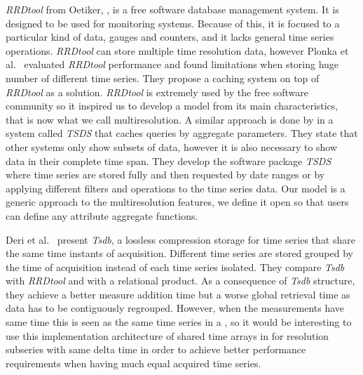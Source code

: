 \emph{RRDtool} from Oetiker, \cite{rrdtool,lisa98:oetiker}, is a free
software database management system. It is designed to be used for
monitoring systems. Because of this, it is focused to a particular
kind of data, gauges and counters, and it lacks general time series
operations. \emph{RRDtool} can store multiple time resolution data,
however Plonka et al.\ \cite{lisa07:plonka} evaluated \emph{RRDtool}
performance and found limitations when storing huge number of
different time series. They propose a caching system on top of
\emph{RRDtool} as a solution.  \emph{RRDtool} is extremely used by the
free software community so it inspired us to develop a model from its
main characteristics, that is now what we call multiresolution. A
similar approach is done by \cite{weigel10} in a system called
\emph{TSDS} that caches queries by aggregate parameters.  They state
that other systems only show subsets of data, however it is also
necessary to show data in their complete time span.  They develop the
software package \emph{TSDS} where time series are stored fully and
then requested by date ranges or by applying different filters and
operations to the time series data.  Our  model is a
generic approach to the multiresolution features, we define it open so
that users can define any attribute aggregate functions.


Deri et al.\ \cite{deri12:tsdb_compressed_database} present
\emph{Tsdb}, a lossless compression storage  for time
series that share the same time instants of acquisition. Different
time series are stored grouped by the time of acquisition instead of
each time series isolated.  They compare \emph{Tsdb} with
\emph{RRDtool} and with a relational product. As a consequence of
\emph{Tsdb} structure, they achieve a better measure addition time but
a worse global retrieval time as data has to be contiguously
regrouped. However, when the measurements have same time this is seen
as the same time series in a , so it would be interesting
to use this implementation architecture of shared time arrays in
 for resolution subseries with same delta time in order to
achieve better performance requirements when having much equal
acquired time series.


